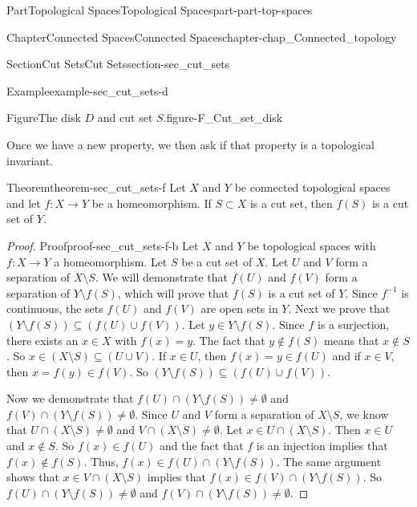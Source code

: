 \documentclass[oneside,10pt,]{book}
\numberwithin{equation}{chapter}
\begin{document}
\begin{partptx}{Part}{Topological Spaces}{}{Topological Spaces}{}{}{part-part-top-spaces}
\begin{chapterptx}{Chapter}{Connected Spaces}{}{Connected Spaces}{}{}{chapter-chap_Connected_topology}
\begin{sectionptx}{Section}{Cut Sets}{}{Cut Sets}{}{}{section-sec_cut_sets}
\begin{example}{Example}{}{example-sec_cut_sets-d}
\begin{enumerate}[font=\bfseries,label=(\alph*),ref=\alph*]
\begin{figureptx}{Figure}{The disk \(D\) and cut set \(S\).}{figure-F_Cut_set_disk}{}
\begin{image}{0.25}{0.5}{0.25}{}
\end{image}%
\tcblower
\end{figureptx}%
\end{enumerate}%
\end{example}
Once we have a new property, we then ask if that property is a topological invariant.%
\begin{theorem}{Theorem}{}{}{theorem-sec_cut_sets-f}%
Let \(X\) and \(Y\) be connected topological spaces and let \(f:X \to Y\) be a homeomorphism. If \(S \subset X\) is a cut set, then \(f(S)\) is a cut set of \(Y\).%
\end{theorem}
\begin{proof}{Proof}{}{proof-sec_cut_sets-f-b}
Let \(X\) and \(Y\) be topological spaces with \(f : X \to Y\) a homeomorphism. Let \(S\) be a cut set of \(X\). Let \(U\) and \(V\) form a separation of \(X \setminus S\). We will demonstrate that \(f(U)\) and \(f(V)\) form a separation of \(Y \setminus f(S)\), which will prove that \(f(S)\) is a cut set of \(Y\). Since \(f^{-1}\) is continuous, the sets \(f(U)\) and \(f(V)\) are open sets in \(Y\). Next we prove that \((Y \setminus f(S)) \subseteq (f(U) \cup f(V))\). Let \(y \in Y \setminus f(S)\). Since \(f\) is a surjection, there exists an \(x \in X\) with \(f(x) = y\). The fact that \(y \notin f(S)\) means that \(x \notin S\). So \(x \in (X \setminus S) \subseteq (U \cup V)\). If \(x \in U\), then \(f(x) = y \in f(U)\) and if \(x \in V\), then \(x = f(y) \in f(V)\). So \((Y \setminus f(S)) \subseteq (f(U) \cup f(V))\).%
\par
Now we demonstrate that \(f(U) \cap (Y \setminus f(S)) \neq \emptyset\) and \(f(V) \cap (Y \setminus f(S)) \neq \emptyset\). Since \(U\) and \(V\) form a separation of \(X \setminus S\), we know that \(U \cap (X \setminus S) \neq \emptyset\) and \(V \cap (X \setminus S) \neq \emptyset\). Let \(x \in U \cap (X \setminus S)\). Then \(x \in U\) and \(x \notin S\). So \(f(x) \in f(U)\) and the fact that \(f\) is an injection implies that \(f(x) \notin f(S)\). Thus, \(f(x) \in f(U) \cap (Y \setminus f(S))\). The same argument shows that \(x \in V \cap (X \setminus S)\) implies that \(f(x) \in f(V) \cap (Y \setminus f(S))\). So \(f(U) \cap (Y \setminus f(S)) \neq \emptyset\) and \(f(V) \cap (Y \setminus f(S)) \neq \emptyset\).%
\par

\end{proof}
\end{sectionptx}
\end{chapterptx}
\end{partptx}
\end{document}
